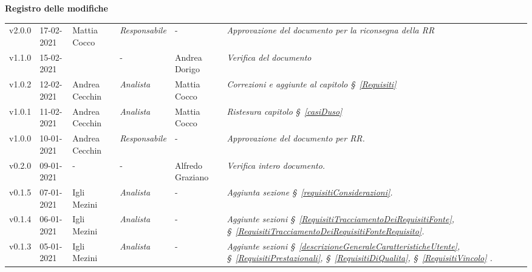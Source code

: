\quad
\begin{center}
	\LARGE\textbf{Registro delle modifiche}
\end{center}
\def\tabularxcolumn#1{m{#1}}
{
	
\begin{center}
	\renewcommand{\arraystretch}{1.4}
	\begin{longtable}[c]{|p{2cm-1\tabcolsep}|p{2cm}|p{3cm-2\tabcolsep}|p{}|p{}|p{4cm-2\tabcolsep}|}
		\hline
		\rowcolor{airforceblue}
		\makecell[c]{\textbf{Versione}} & \makecell[c]{\textbf{Data}} & \makecell[c]{\textbf{Autore}} & \makecell[c]{\textbf{Ruolo}} & \makecell[c]{\textbf{Verificatore}} & \makecell[c]{\textbf{Modifica}}\\
		\hline
		\centering v2.0.0 & 17-02-2021 & Mattia Cocco & \centering \textit{Responsabile} & \centering - & \textit{Approvazione del documento per la riconsegna della RR} \\
		\centering v1.1.0 & 15-02-2021 & \centering & \centering - & Andrea Dorigo & \textit{Verifica del documento} \\
		\centering v1.0.2 & 12-02-2021 & Andrea Cecchin & \centering \textit{Analista} & Mattia Cocco & \textit{Correzioni e aggiunte al capitolo \S~\ref{Requisiti}} \\
		\hline
		\centering v1.0.1 & 11-02-2021 & Andrea Cecchin & \centering \textit{Analista} & Mattia Cocco & \textit{Ristesura capitolo \S~\ref{casiDuso}} \\
		\hline
		\centering v1.0.0 & 10-01-2021 & Andrea Cecchin & \centering \textit{Responsabile} & \centering - & \textit{Approvazione del documento per RR.} \\
		\hline
		\centering v0.2.0 & 09-01-2021 & \centering - & \centering - & Alfredo Graziano & \textit{Verifica intero documento.} \\
		\hline
		\centering v0.1.5 & 07-01-2021 & Igli Mezini & \centering \textit{Analista} & \centering - & \textit{Aggiunta sezione \S~\ref{requisitiConsiderazioni}.} \\
		\hline
		\centering v0.1.4 & 06-01-2021 & Igli Mezini & \centering \textit{Analista} & \centering - & \textit{Aggiunte sezioni \S~\ref{RequisitiTracciamentoDeiRequisitiFonte}, \S~\ref{RequisitiTracciamentoDeiRequisitiFonteRequisito}.} \\
		\hline
		\centering v0.1.3 & 05-01-2021 & Igli Mezini & \centering \textit{Analista} & \centering - & \textit{Aggiunte sezioni \S~\ref{descrizioneGeneraleCaratteristicheUtente}, \S~\ref{RequisitiPrestazionali}, \S~\ref{RequisitiDiQualita}, \S~\ref{RequisitiVincolo} .} \\

\end{longtable}
\end{center}}
